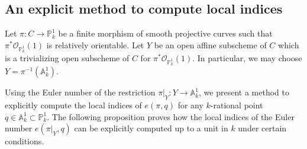 \documentclass[12pt, reqno]{amsart}
\theoremstyle{definition}
\newcommand{\A}{\mathbb{A}} %
\newcommand{\Proj}{\mathbb{P}} %
\newcommand{\Adeg}{\deg^{\mathbb{A}^1}} %
\newcommand{\Oh}{\mathscr{O}} %
\begin{document}
\subsection{An explicit method to compute local indices}
\label{subsec: explicit method}

Let $\pi: C \to \mathbb{P}^1_k$ be a finite morphism of smooth projective curves such that $\pi^* \Oh_{\Proj^1_k}(1)$ is relatively orientable. Let $Y$ be an open affine subscheme of $C$ which is a trivializing open subscheme of $C$ for $\pi^* \Oh_{\Proj^1_k}(1)$. In particular, we may choose $Y = \pi^{-1}(\A^1_k)$. 

Using the Euler number of the restriction $\pi|_Y: Y \to \A^1_k$, we present a method to explicitly compute the local indices of $e(\pi,q)$ for any $k$-rational point $q \in \A^1_k \subset \mathbb{P}^1_k$. The following proposition proves how the local indices of the Euler number $e(\pi|_Y, q)$ can be explicitly computed up to a unit in $k$ under certain conditions.


\end{document}
